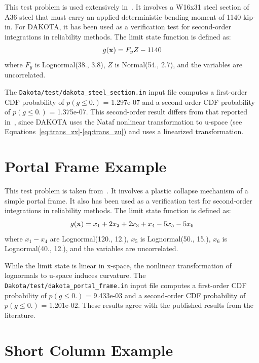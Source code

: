This test problem is used extensively in~\cite{Hal00}.  It involves a
W16x31 steel section of A36 steel that must carry an applied
deterministic bending moment of 1140 kip-in.  For DAKOTA, it has been
used as a verification test for second-order integrations in
reliability methods.  The limit state function is defined as:
\begin{equation}
g({\bf x}) = F_y Z - 1140
\end{equation}
where $F_y$ is Lognormal(38., 3.8), $Z$ is Normal(54., 2.7), and the
variables are uncorrelated.

The \texttt{Dakota/test/dakota\_steel\_section.in} input file computes
a first-order CDF probability of $p(g \leq 0.)$ = 1.297e-07 and a
second-order CDF probability of $p(g \leq 0.)$ = 1.375e-07.  This
second-order result differs from that reported in~\cite{Hal00}, since
DAKOTA uses the Nataf nonlinear transformation to u-space (see
Equations~\ref{eq:trans_zx}-\ref{eq:trans_zu}) and \cite{Hal00} uses a
linearized transformation.

\section{Portal Frame Example}\label{additional:portal_frame}

This test problem is taken from~\cite{Tve90,Hon99}.  It involves a
plastic collapse mechanism of a simple portal frame.  It also has been
used as a verification test for second-order integrations in 
reliability methods.  The limit state function is defined as:
\begin{equation}
g({\bf x}) = x_1 + 2 x_2 + 2 x_3 + x_4 - 5 x_5 - 5 x_6
\end{equation}
where $x_1 - x_4$ are Lognormal(120., 12.), $x_5$ is Lognormal(50.,
15.), $x_6$ is Lognormal(40., 12.), and the variables are uncorrelated.

While the limit state is linear in x-space, the nonlinear
transformation of lognormals to u-space induces curvature.  The
\texttt{Dakota/test/dakota\_portal\_frame.in} input file computes a
first-order CDF probability of $p(g \leq 0.)$ = 9.433e-03 and a
second-order CDF probability of $p(g \leq 0.)$ = 1.201e-02.  These
results agree with the published results from the literature.


\section{Short Column Example}\label{additional:short_column}

